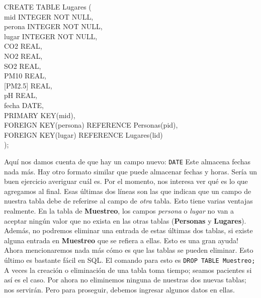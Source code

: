 \documentclass[10pt,letterpaper]{article}
\newcommand{\inlinecode}[1]{
\colorbox{light-gray}{\texttt{#1}}
}
\newenvironment{Code}
{
\begin{lrbox}{\selvestebox}%
\begin{minipage}{\dimexpr\columnwidth-2\fboxsep\relax}
\fontfamily{\ttdefault}\selectfont
}
{\end{minipage}\end{lrbox}%
\begin{center}
\colorbox{light-gray}{\usebox{\selvestebox}}
\end{center}
}
\begin{document}
\begin{Code}
CREATE TABLE Lugares (\\
\hspace*{5mm}mid INTEGER NOT NULL,\\
\hspace*{5mm}perona INTEGER NOT NULL,\\
\hspace*{5mm}lugar INTEGER NOT NULL,\\
\hspace*{5mm}CO2 REAL,\\
\hspace*{5mm}NO2 REAL,\\
\hspace*{5mm}SO2 REAL,\\
\hspace*{5mm}PM10 REAL,\\
\hspace*{5mm}[PM2.5] REAL,\\
\hspace*{5mm}pH REAL,\\
\hspace*{5mm}fecha DATE,\\
\hspace*{5mm}PRIMARY KEY(mid),\\
\hspace*{5mm}FOREIGN KEY(persona) REFERENCE Personas(pid),\\
\hspace*{5mm}FOREIGN KEY(lugar) REFERENCE Lugares(lid)\\
);
\end{Code}

Aqu\'i nos damos cuenta de que hay un campo nuevo: \inlinecode{DATE} Este almacena fechas nada m\'as. Hay otro formato similar que puede almacenar fechas y horas. Ser\'ia un buen ejercicio averiguar cu\'al es. Por el momento, nos interesa ver qu\'e es lo que agregamos al final. Esas \'ultimas dos l\'ineas son las que indican que un campo de nuestra tabla debe de referirse al campo de \emph{otra} tabla. Esto tiene varias ventajas realmente. En la tabla de \textbf{Muestreo}, los campos \emph{persona} o \emph{lugar} no van a aceptar ning\'un valor que no exista en las otras tablas (\textbf{Personas} y \textbf{Lugares}). Adem\'as, no podremos eliminar una entrada de estas \'ultimas dos tablas, si existe alguna entrada en \textbf{Muestreo} que se refiera a ellas. Esto es una gran ayuda!\\

Ahora mencionaremos nada m\'as c\'omo es que las tablas se pueden eliminar. Esto \'ultimo es bastante f\'acil en SQL. El comando para esto es \inlinecode{DROP TABLE Muestreo;} A veces la creaci\'on o eliminaci\'on de una tabla toma tiempo; seamos pacientes si as\'i es el caso. Por ahora no eliminemos ninguna de nuestras dos nuevas tablas; nos servir\'an. Pero para proseguir, debemos ingresar algunos datos en ellas.
\end{document}
